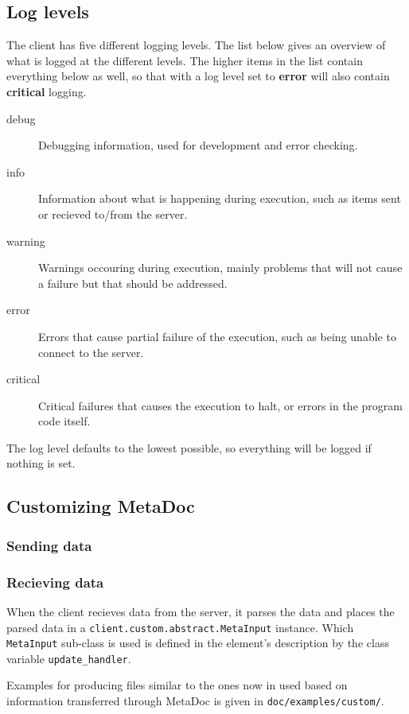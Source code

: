 \documentclass[titlepage, a4paper,10pt]{article}
\begin{document}
\subsection{Log levels}
\label{sec:loglevels}
The client has five different logging levels. The list below gives an overview
of what is logged at the different levels. The higher items in the list contain
everything below as well, so that with a log level set to \textbf{error} will
also contain \textbf{critical} logging.

\begin{description}
    \item[debug]    Debugging information, used for development and error
    checking.
    \item[info] Information about what is happening during execution, such as
    items sent or recieved to/from the server.
    \item[warning]  Warnings occouring during execution, mainly problems that
    will not cause a failure but that should be addressed.
    \item[error]    Errors that cause partial failure of the execution, such as
    being unable to connect to the server.
    \item[critical] Critical failures that causes the execution to halt, or
    errors in the program code itself.
\end{description}

The log level defaults to the lowest possible, so everything will be logged if
nothing is set.

\subsection{Customizing MetaDoc}

\subsubsection{Sending data}

\subsubsection{Recieving data}
When the client recieves data from the server, it parses the data and places
the parsed data in a \texttt{client.custom.abstract.MetaInput} instance. Which
\texttt{MetaInput} sub-class is used is defined in the element's description by
the class variable \texttt{update\_handler}.

Examples for producing files similar to the ones now in used based on
information transferred through MetaDoc is given in
\texttt{doc/examples/custom/}.
\end{document}
